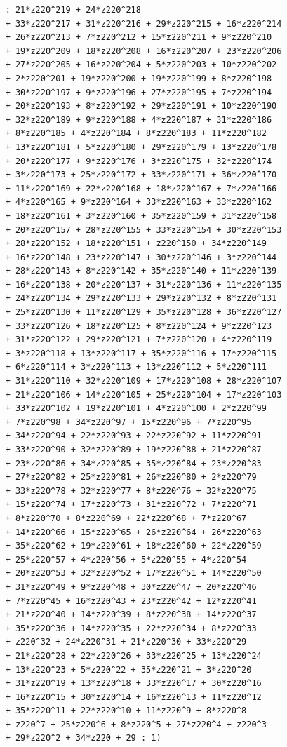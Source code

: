 \documentclass{scrartcl}
\theoremstyle{definition}
\begin{document}
\begin{lstlisting}
    : 21*z220^219 + 24*z220^218 
    + 33*z220^217 + 31*z220^216 + 29*z220^215 + 16*z220^214 
    + 26*z220^213 + 7*z220^212 + 15*z220^211 + 9*z220^210 
    + 19*z220^209 + 18*z220^208 + 16*z220^207 + 23*z220^206 
    + 27*z220^205 + 16*z220^204 + 5*z220^203 + 10*z220^202 
    + 2*z220^201 + 19*z220^200 + 19*z220^199 + 8*z220^198 
    + 30*z220^197 + 9*z220^196 + 27*z220^195 + 7*z220^194 
    + 20*z220^193 + 8*z220^192 + 29*z220^191 + 10*z220^190 
    + 32*z220^189 + 9*z220^188 + 4*z220^187 + 31*z220^186 
    + 8*z220^185 + 4*z220^184 + 8*z220^183 + 11*z220^182 
    + 13*z220^181 + 5*z220^180 + 29*z220^179 + 13*z220^178 
    + 20*z220^177 + 9*z220^176 + 3*z220^175 + 32*z220^174 
    + 3*z220^173 + 25*z220^172 + 33*z220^171 + 36*z220^170 
    + 11*z220^169 + 22*z220^168 + 18*z220^167 + 7*z220^166 
    + 4*z220^165 + 9*z220^164 + 33*z220^163 + 33*z220^162 
    + 18*z220^161 + 3*z220^160 + 35*z220^159 + 31*z220^158 
    + 20*z220^157 + 28*z220^155 + 33*z220^154 + 30*z220^153 
    + 28*z220^152 + 18*z220^151 + z220^150 + 34*z220^149 
    + 16*z220^148 + 23*z220^147 + 30*z220^146 + 3*z220^144 
    + 28*z220^143 + 8*z220^142 + 35*z220^140 + 11*z220^139 
    + 16*z220^138 + 20*z220^137 + 31*z220^136 + 11*z220^135 
    + 24*z220^134 + 29*z220^133 + 29*z220^132 + 8*z220^131 
    + 25*z220^130 + 11*z220^129 + 35*z220^128 + 36*z220^127 
    + 33*z220^126 + 18*z220^125 + 8*z220^124 + 9*z220^123 
    + 31*z220^122 + 29*z220^121 + 7*z220^120 + 4*z220^119 
    + 3*z220^118 + 13*z220^117 + 35*z220^116 + 17*z220^115 
    + 6*z220^114 + 3*z220^113 + 13*z220^112 + 5*z220^111 
    + 31*z220^110 + 32*z220^109 + 17*z220^108 + 28*z220^107 
    + 21*z220^106 + 14*z220^105 + 25*z220^104 + 17*z220^103 
    + 33*z220^102 + 19*z220^101 + 4*z220^100 + 2*z220^99 
    + 7*z220^98 + 34*z220^97 + 15*z220^96 + 7*z220^95 
    + 34*z220^94 + 22*z220^93 + 22*z220^92 + 11*z220^91 
    + 33*z220^90 + 32*z220^89 + 19*z220^88 + 21*z220^87 
    + 23*z220^86 + 34*z220^85 + 35*z220^84 + 23*z220^83 
    + 27*z220^82 + 25*z220^81 + 26*z220^80 + 2*z220^79 
    + 33*z220^78 + 32*z220^77 + 8*z220^76 + 32*z220^75 
    + 15*z220^74 + 17*z220^73 + 31*z220^72 + 7*z220^71 
    + 8*z220^70 + 8*z220^69 + 22*z220^68 + 7*z220^67 
    + 14*z220^66 + 15*z220^65 + 26*z220^64 + 26*z220^63 
    + 35*z220^62 + 19*z220^61 + 18*z220^60 + 22*z220^59 
    + 25*z220^57 + 4*z220^56 + 5*z220^55 + 4*z220^54 
    + 20*z220^53 + 32*z220^52 + 17*z220^51 + 14*z220^50 
    + 31*z220^49 + 9*z220^48 + 30*z220^47 + 20*z220^46 
    + 7*z220^45 + 16*z220^43 + 23*z220^42 + 12*z220^41 
    + 21*z220^40 + 14*z220^39 + 8*z220^38 + 14*z220^37 
    + 35*z220^36 + 14*z220^35 + 22*z220^34 + 8*z220^33 
    + z220^32 + 24*z220^31 + 21*z220^30 + 33*z220^29 
    + 21*z220^28 + 22*z220^26 + 33*z220^25 + 13*z220^24 
    + 13*z220^23 + 5*z220^22 + 35*z220^21 + 3*z220^20 
    + 31*z220^19 + 13*z220^18 + 33*z220^17 + 30*z220^16 
    + 16*z220^15 + 30*z220^14 + 16*z220^13 + 11*z220^12 
    + 35*z220^11 + 22*z220^10 + 11*z220^9 + 8*z220^8 
    + z220^7 + 25*z220^6 + 8*z220^5 + 27*z220^4 + z220^3 
    + 29*z220^2 + 34*z220 + 29 : 1)
\end{lstlisting}
\end{document}
